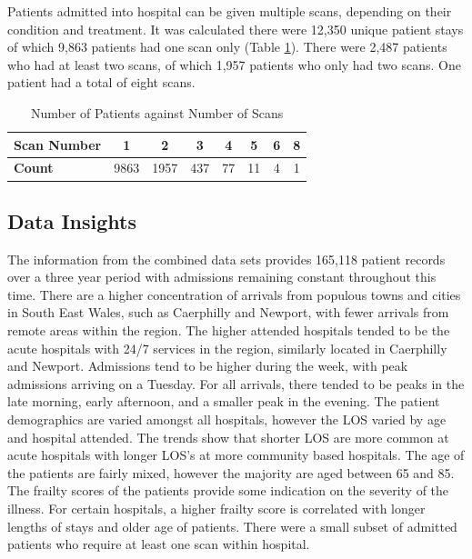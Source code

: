 \documentclass[../thesis.tex]{subfiles}
\begin{document}
Patients admitted into hospital can be given multiple scans, depending on their condition and treatment. It was calculated there were 12,350 unique patient stays of which 9,863 patients had one scan only (Table \ref{Tab:Scan}). There were 2,487 patients who had at least two scans, of which 1,957 patients who only had two scans. One patient had a total of eight scans. 

\begin{table}[h!]
    \centering
    \begin{tabular}{lccccccc}\toprule
    \textbf{Scan Number} & \textbf{1} & \textbf{2} & \textbf{3} & \textbf{4} & \textbf{5} & \textbf{6} & \textbf{8}   \\ \midrule
\textbf{Count} & 9863 & 1957 & 437 & 77 & 11 & 4& 1\\ \bottomrule
    \end{tabular}
    \caption{Number of Patients against Number of Scans}
    \label{Tab:Scan}
\end{table}





\subsection{Data Insights}
The information from the combined data sets provides 165,118 patient records over a three year period with admissions remaining constant throughout this time. There are a higher concentration of arrivals from populous towns and cities in South East Wales, such as Caerphilly and Newport, with fewer arrivals from remote areas within the region. The higher attended hospitals tended to be the acute hospitals with 24/7 services in the region, similarly located in Caerphilly and Newport. Admissions tend to be higher during the week, with peak admissions arriving on a Tuesday. For all arrivals, there tended to be peaks in the late morning, early afternoon, and a smaller peak in the evening. The patient demographics are varied amongst all hospitals, however the LOS varied by age and hospital attended. The trends show that shorter LOS are more common at acute hospitals with longer LOS's at more community based hospitals. The age of the patients are fairly mixed, however the majority are aged between 65 and 85. The frailty scores of the patients provide some indication on the severity of the illness. For certain hospitals, a higher frailty score is correlated with longer lengths of stays and older age of patients. There were a small subset of admitted patients who require at least one scan within hospital.
\end{document}
